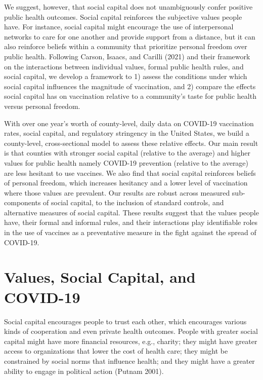 \documentclass[
]{article}
\begin{document}
We suggest, however, that social capital does not unambiguously confer
positive public health outcomes. Social capital reinforces the
subjective values people have. For instance, social capital might
encourage the use of interpersonal networks to care for one another and
provide support from a distance, but it can also reinforce beliefs
within a community that prioritize personal freedom over public health.
Following Carson, Isaacs, and Carilli (2021) and their framework on the
interactions between individual values, formal public health rules, and
social capital, we develop a framework to 1) assess the conditions under
which social capital influences the magnitude of vaccination, and 2)
compare the effects social capital has on vaccination relative to a
community's taste for public health versus personal freedom.

With over one year's worth of county-level, daily data on COVID-19
vaccination rates, social capital, and regulatory stringency in the
United States, we build a county-level, cross-sectional model to assess
these relative effects. Our main result is that counties with stronger
social capital (relative to the average) and higher values for public
health namely COVID-19 prevention (relative to the average) are less
hesitant to use vaccines. We also find that social capital reinforces
beliefs of personal freedom, which increases hesitancy and a lower level
of vaccination where those values are prevalent. Our results are robust
across measured sub-components of social capital, to the inclusion of
standard controls, and alternative measures of social capital. These
results suggest that the values people have, their formal and informal
rules, and their interactions play identifiable roles in the use of
vaccines as a preventative measure in the fight against the spread of
COVID-19.

\hypertarget{values-social-capital-and-covid-19}{%
\section{Values, Social Capital, and
COVID-19}\label{values-social-capital-and-covid-19}}

Social capital encourages people to trust each other, which encourages
various kinds of cooperation and even private health outcomes. People
with greater social capital might have more financial resources, e.g.,
charity; they might have greater access to organizations that lower the
cost of health care; they might be constrained by social norms that
influence health; and they might have a greater ability to engage in
political action (Putnam 2001).
\end{document}

